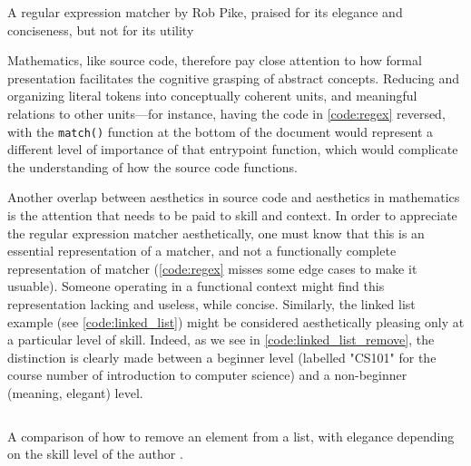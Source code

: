 \begin{listing}
    \inputminted{c}{./corpus/regex.c}
    \caption{A regular expression matcher by Rob Pike, praised for its elegance and conciseness, but not for its utility \citep{oram_beautiful_2007}}
    \label{code:regex}
\end{listing}

Mathematics, like source code, therefore pay close attention to how formal presentation facilitates the cognitive grasping of abstract concepts. Reducing and organizing literal tokens into conceptually coherent units, and meaningful relations to other units—for instance, having the code in \ref{code:regex} reversed, with the \lstinline{match()} function at the bottom of the document would represent a different level of importance of that entrypoint function, which would complicate the understanding of how the source code functions.

Another overlap between aesthetics in source code and aesthetics in mathematics is the attention that needs to be paid to skill and context. In order to appreciate the regular expression matcher aesthetically, one must know that this is an essential representation of a matcher, and not a functionally complete representation of matcher (\ref{code:regex} misses some edge cases to make it usuable). Someone operating in a functional context might find this representation lacking and useless, while concise. Similarly, the linked list example (see \ref{code:linked_list}) might be considered aesthetically pleasing only at a particular level of skill. Indeed, as we see in \ref{code:linked_list_remove}, the distinction is clearly made between a beginner level (labelled "CS101" for the course number of introduction to computer science) and a non-beginner (meaning, elegant) level.

\begin{listing}
    \inputminted{c}{./corpus/linked_list.c}
    \caption{A comparison of how to remove an element from a list, with elegance depending on the skill level of the author \citep{kirchner_linked_2022a}.}
    \label{code:linked_list_remove}
\end{listing}


